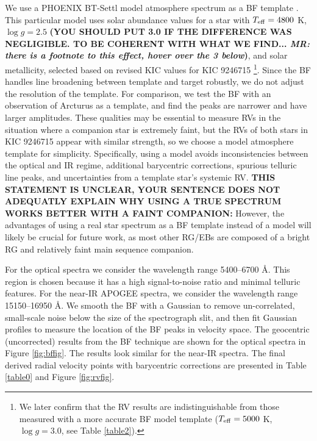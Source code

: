We use a PHOENIX BT-Settl model atmosphere spectrum as a BF template \citep{all03}. This particular model uses \citet{asp09} solar abundance values for a star with $T_{\rm{eff}} = 4800$ K, $\log g = 2.5$ {\bf{(YOU SHOULD PUT 3.0 IF THE DIFFERENCE WAS NEGLIGIBLE. TO BE COHERENT WITH WHAT WE FIND... \textit{MR: there is a footnote to this effect, hover over the 3 below})}}, and solar metallicity, selected based on revised KIC values for KIC 9246715 \citep{hub14.2}\footnote{We later confirm that the RV results are indistinguishable from those measured with a more accurate BF model template ($T_{\rm{eff}} = 5000$ K, $\log g = 3.0$, see Table \ref{table2}).}. Since the BF handles line broadening between template and target robustly, we do not adjust the resolution of the template. For comparison, we test the BF with an observation of Arcturus as a template, and find the peaks are narrower and have larger amplitudes. These qualities may be essential to measure RVs in the situation where a companion star is extremely faint, but the RVs of both stars in KIC 9246715 appear with similar strength, so we choose a model atmosphere template for simplicity. Specifically, using a model avoids inconsistencies between the optical and IR regime, additional barycentric corrections, spurious telluric line peaks, and uncertainties from a template star's systemic RV. {\bf{THIS STATEMENT IS UNCLEAR, YOUR SENTENCE DOES NOT ADEQUATLY EXPLAIN WHY USING A TRUE SPECTRUM WORKS BETTER WITH A FAINT COMPANION:}} However, the advantages of using a real star spectrum as a BF template instead of a model will likely be crucial for future work, as most other RG/EBs are composed of a bright RG and relatively faint main sequence companion.

For the optical spectra we consider the wavelength range 5400--6700 \AA. This region is chosen because it has a high signal-to-noise ratio and minimal telluric features. For the near-IR APOGEE spectra, we consider the wavelength range 15150--16950 \AA. We smooth the BF with a Gaussian to remove un-correlated, small-scale noise below the size of the spectrograph slit, and then fit Gaussian profiles to measure the location of the BF peaks in velocity space. The geocentric (uncorrected) results from the BF technique are shown for the optical spectra in Figure \ref{fig:bffig}. The results look similar for the near-IR spectra. The final derived radial velocity points with barycentric corrections are presented in Table \ref{table0} and Figure \ref{fig:rvfig}.


